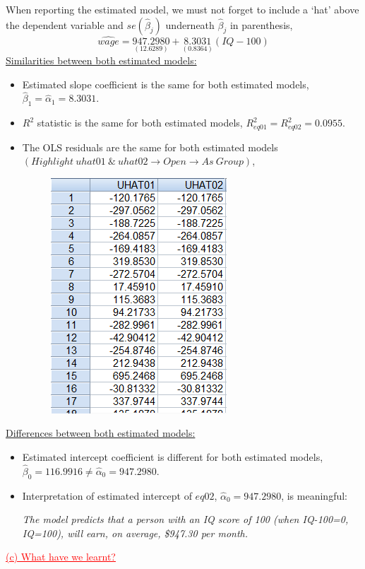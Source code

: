 \documentclass[12pt]{report}
\begin{document}
\noindent When reporting the estimated model, we must not forget to include a `hat' above the dependent variable and $se(\hat{\beta}_j)$ underneath $\hat{\beta}_j$ in parenthesis,
$$\widehat{wage} = \underset{(12.6289)}{947.2980} + \underset{(0.8364)}{8.3031}(IQ-100)$$
\noindent \underline{Similarities between both estimated models:}
\begin{itemize}
	\item Estimated slope coefficient is the same for both estimated models, $\hat{\beta}_1 = \hat{\alpha}_1 = 8.3031$.
	\item $R^2$ statistic is the same for both estimated models, $R^2_{eq01} = R^2_{eq02} = 0.0955$.
	\item The OLS residuals are the same for both estimated models $(Highlight\ uhat01\ \&\ uhat02 \to Open \to As\ Group)$,
	\begin{figure}[H]
		\centering
		\includegraphics{q3_28}
	\end{figure}
\end{itemize}
\noindent \underline{Differences between both estimated models:}
\begin{itemize}
	\item Estimated intercept coefficient is different for both estimated models, $\hat{\beta}_0 = 116.9916 \neq  \hat{\alpha}_0 = 947.2980$.
	\item Interpretation of estimated intercept of $eq02$, $\hat{\alpha}_0 = 947.2980$, is meaningful: 
	
	\textit{The model predicts that a person with an IQ score of 100 (when IQ-100=0, IQ=100), will earn, on average, \$947.30 per month.}
\end{itemize}
\noindent \textcolor{red}{\underline{(c) What have we learnt?}}
\end{document}
